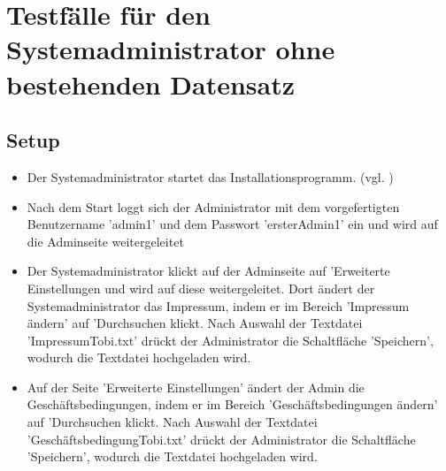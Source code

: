 \documentclass[a4paper]{scrreprt}
\begin{document}
	\section{Testfälle für den Systemadministrator ohne bestehenden Datensatz}
		\subsection{Setup}
			\begin{itemize}
				\item {} 
				Der Systemadministrator startet das Installationsprogramm. (vgl. )
						
				\item Nach dem Start loggt sich der Administrator mit dem vorgefertigten Benutzername 'admin1' und dem Passwort 'ersterAdmin1' ein und wird auf die Adminseite weitergeleitet
				 
				 \item {}
				 Der Systemadministrator klickt auf der Adminseite auf 'Erweiterte Einstellungen und wird auf diese weitergeleitet. Dort ändert der Systemadministrator das Impressum, indem er im Bereich 'Impressum ändern' auf 'Durchsuchen klickt. Nach Auswahl der Textdatei 'ImpressumTobi.txt' drückt der Administrator die Schaltfläche 'Speichern', wodurch die Textdatei hochgeladen wird.
				 
				 \item {}
				 Auf der Seite 'Erweiterte Einstellungen' ändert der Admin die Geschäftsbedingungen, indem er im Bereich 'Geschäftsbedingungen ändern' auf 'Durchsuchen klickt. Nach Auswahl der Textdatei 'GeschäftsbedingungTobi.txt' drückt der Administrator die Schaltfläche 'Speichern', wodurch die Textdatei hochgeladen wird.	 
			\end{itemize}		
				
\end{document}
